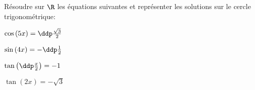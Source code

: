 
\begin{exercice}  \;
R\'esoudre sur $\R$ les \'equations suivantes et repr\'esenter les solutions sur le cercle trigonom\'etrique:\\
\begin{enumerate}
\begin{minipage}[t]{0.45\textwidth}
\item $\cos{(5x)}=\ddp\frac{\sqrt{3}}{2}$
\item $\sin{(4x)}=-\ddp\frac{1}{2}$
\end{minipage}
\begin{minipage}[t]{0.45\textwidth}
\item $\tan{\left(\ddp\frac{x}{2}\right)}=-1$
\item $\tan{(2x)}=-\sqrt{3}$
\end{minipage}
\end{enumerate}
\end{exercice}
